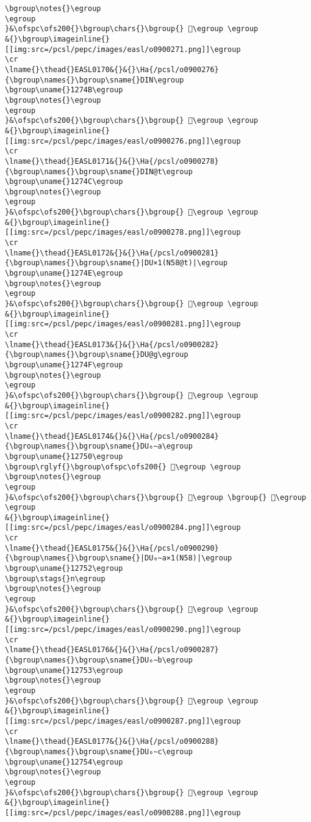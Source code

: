 \begin{verbatim}
\bgroup\notes{}\egroup
\egroup
}&\ofspc\ofs200{}\bgroup\chars{}\bgroup{} 𒝊\egroup \egroup
&{}\bgroup\imageinline{}[[img:src=/pcsl/pepc/images/easl/o0900271.png]]\egroup
\cr
\lname{}\thead{}EASL0170&{}&{}\Ha{/pcsl/o0900276}{\bgroup\names{}\bgroup\sname{}DIN\egroup
\bgroup\uname{}1274B\egroup
\bgroup\notes{}\egroup
\egroup
}&\ofspc\ofs200{}\bgroup\chars{}\bgroup{} 𒝋\egroup \egroup
&{}\bgroup\imageinline{}[[img:src=/pcsl/pepc/images/easl/o0900276.png]]\egroup
\cr
\lname{}\thead{}EASL0171&{}&{}\Ha{/pcsl/o0900278}{\bgroup\names{}\bgroup\sname{}DIN@t\egroup
\bgroup\uname{}1274C\egroup
\bgroup\notes{}\egroup
\egroup
}&\ofspc\ofs200{}\bgroup\chars{}\bgroup{} 𒝌\egroup \egroup
&{}\bgroup\imageinline{}[[img:src=/pcsl/pepc/images/easl/o0900278.png]]\egroup
\cr
\lname{}\thead{}EASL0172&{}&{}\Ha{/pcsl/o0900281}{\bgroup\names{}\bgroup\sname{}|DU×1(N58@t)|\egroup
\bgroup\uname{}1274E\egroup
\bgroup\notes{}\egroup
\egroup
}&\ofspc\ofs200{}\bgroup\chars{}\bgroup{} 𒝎\egroup \egroup
&{}\bgroup\imageinline{}[[img:src=/pcsl/pepc/images/easl/o0900281.png]]\egroup
\cr
\lname{}\thead{}EASL0173&{}&{}\Ha{/pcsl/o0900282}{\bgroup\names{}\bgroup\sname{}DU@g\egroup
\bgroup\uname{}1274F\egroup
\bgroup\notes{}\egroup
\egroup
}&\ofspc\ofs200{}\bgroup\chars{}\bgroup{} 𒝏\egroup \egroup
&{}\bgroup\imageinline{}[[img:src=/pcsl/pepc/images/easl/o0900282.png]]\egroup
\cr
\lname{}\thead{}EASL0174&{}&{}\Ha{/pcsl/o0900284}{\bgroup\names{}\bgroup\sname{}DU₆∼a\egroup
\bgroup\uname{}12750\egroup
\bgroup\rglyf{}\bgroup\ofspc\ofs200{} 𒝐\egroup \egroup
\bgroup\notes{}\egroup
\egroup
}&\ofspc\ofs200{}\bgroup\chars{}\bgroup{} 𒝑\egroup \bgroup{} 𒝐\egroup \egroup
&{}\bgroup\imageinline{}[[img:src=/pcsl/pepc/images/easl/o0900284.png]]\egroup
\cr
\lname{}\thead{}EASL0175&{}&{}\Ha{/pcsl/o0900290}{\bgroup\names{}\bgroup\sname{}|DU₆∼a×1(N58)|\egroup
\bgroup\uname{}12752\egroup
\bgroup\stags{}n\egroup
\bgroup\notes{}\egroup
\egroup
}&\ofspc\ofs200{}\bgroup\chars{}\bgroup{} 𒝒\egroup \egroup
&{}\bgroup\imageinline{}[[img:src=/pcsl/pepc/images/easl/o0900290.png]]\egroup
\cr
\lname{}\thead{}EASL0176&{}&{}\Ha{/pcsl/o0900287}{\bgroup\names{}\bgroup\sname{}DU₆∼b\egroup
\bgroup\uname{}12753\egroup
\bgroup\notes{}\egroup
\egroup
}&\ofspc\ofs200{}\bgroup\chars{}\bgroup{} 𒝓\egroup \egroup
&{}\bgroup\imageinline{}[[img:src=/pcsl/pepc/images/easl/o0900287.png]]\egroup
\cr
\lname{}\thead{}EASL0177&{}&{}\Ha{/pcsl/o0900288}{\bgroup\names{}\bgroup\sname{}DU₆∼c\egroup
\bgroup\uname{}12754\egroup
\bgroup\notes{}\egroup
\egroup
}&\ofspc\ofs200{}\bgroup\chars{}\bgroup{} 𒝔\egroup \egroup
&{}\bgroup\imageinline{}[[img:src=/pcsl/pepc/images/easl/o0900288.png]]\egroup

\end{verbatim}
